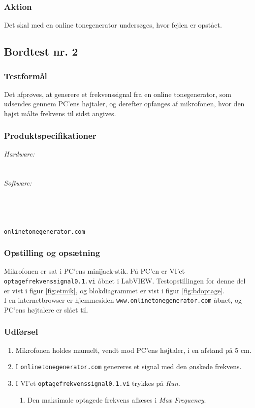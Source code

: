 			\subsubsection{Aktion}
			Det skal med en online tonegenerator undersøges, hvor fejlen er opstået. 

	\subsection{Bordtest nr. 2} %
		\subsubsection{Testformål}
		Det afprøves, at generere et frekvenssignal fra en online tonegenerator, som udsendes gennem PC'ens højtaler, og derefter opfanges af mikrofonen, hvor den højst målte frekvens til sidst angives.  
		
		\subsubsection{Produktspecifikationer}
		
		\textit{Hardware:}\\
		\mikrofon\\
		\PC\\
	
		\textit{Software:}\\
		\labview\\
		\visa\\
		\vi\\
		\ardsw\\
		\texttt{onlinetonegenerator.com}
		
		\subsubsection{Opstilling og opsætning}
		Mikrofonen er sat i PC'ens minijack-stik. På PC'en er VI'et \texttt{optagefrekvenssignal0.1.vi} åbnet i LabVIEW. Testopstillingen for denne del er vist i figur \ref{fig:etmik}, og blokdiagrammet er vist i figur \ref{fig:bdoptage}.\\ 
		I en internetbrowser er hjemmesiden \texttt{www.onlinetonegenerator.com} åbnet, og PC'ens højtalere er slået til. 
		
		\subsubsection{Udførsel}
			\begin{enumerate}
				\item Mikrofonen holdes manuelt, vendt mod PC'ens højtaler, i en afstand på 5 cm. 
				\item I \texttt{onlinetonegenerator.com} genereres et signal med den ønskede frekvens. 
				\item I VI'et \texttt{optagefrekvenssignal0.1.vi} trykkes på \textit{Run}. 
					\begin{enumerate}
						\item Den maksimale optagede frekvens aflæses i \textit{Max Frequency}. 
					\end{enumerate}	  
			\end{enumerate}
			

